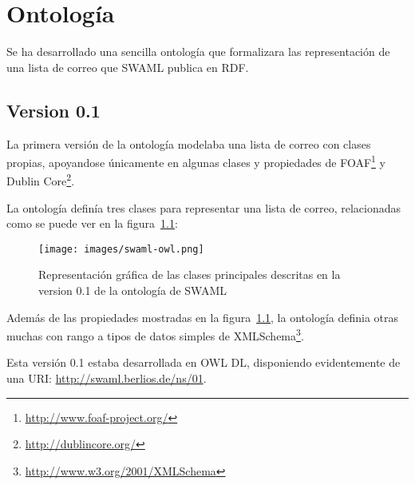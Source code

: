 
\chapter{Ontología}

Se ha desarrollado una sencilla ontología que formalizara las representación de 
una lista de correo que SWAML publica en RDF. 

\section{Version 0.1}\label{sec:ont:0.1}

La primera versión de la ontología modelaba una lista de correo con clases propias,
apoyandose únicamente en algunas clases y propiedades de 
FOAF\footnote{\url{http://www.foaf-project.org/}} y 
Dublin Core\footnote{\url{http://dublincore.org/}}.

La ontología definía tres clases para representar una lista de correo, relacionadas
como se puede ver en la figura~\ref{fig:swamlOWL}:

\begin{figure}[H]
	\centering
	\texttt{[image: images/swaml-owl.png]}
	\caption{Representación gráfica de las clases principales descritas en la version 0.1 de la ontología de SWAML}
	\label{fig:swamlOWL}
\end{figure}

Además de las propiedades mostradas en la figura~\ref{fig:swamlOWL}, la ontología
definia otras muchas con rango a tipos de datos simples de
XMLSchema\footnote{\url{http://www.w3.org/2001/XMLSchema}}.

Esta versión 0.1 estaba desarrollada en OWL DL, disponiendo evidentemente
de una URI: \url{http://swaml.berlios.de/ns/01}.

\newpage

